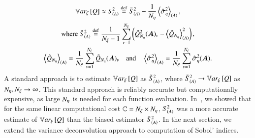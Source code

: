 \begin{gather} \label{eq:var-deconv}
    \mathbb{V}ar_{\xi}\left[Q\right] \approx S^2_{\left( A \right)} \overset{\operatorname{def}}{=} \tilde{S}^2_{\left( A \right)} - \frac{1}{{N_\eta}}\left< \hat{\sigma}^2_\eta \right>_{\left(A \right)} ,\\ \label{eq:samp-var}
    \text{where } \tilde{S}^2_{\left( A \right)} \overset{\operatorname{def}}{=} \frac{1}{{N_\xi} - 1} \sum_{v=1}^{{N_\xi}} \left( \tilde{Q}_{{N_\eta}}^2 (\bm{A})_v - \left< \tilde{Q}_{{N_\eta}} \right>_{\left(A \right)}^2 \right) , \\ \nonumber 
    \left< \tilde{Q}_{{N_\eta}} \right>_{\left(A \right)} = \frac{1}{{N_\xi}} \sum_{v=1}^{{N_\xi}} \tilde{Q}_{{N_\eta}}(\bm{A})_v \quad \text{and} \quad \left< \hat{\sigma}^2_\eta \right>_{\left(A \right)} = \frac{1}{{N_\xi}} \sum_{v=1}^{{N_\xi}} \hat{\sigma}^2_\eta(\bm{A}) .
\end{gather}
A standard approach is to estimate $\mathbb{V}ar_{\xi}\left[Q\right]$ as $\tilde{S}^2_{\left( A \right)}$, where $\tilde{S}^2_{\left( A \right)} \rightarrow \mathbb{V}ar_{\xi}\left[Q\right]$ as ${N_\eta},{N_\xi} \rightarrow \infty$. 
This standard approach is reliably accurate but computationally expensive, as large ${N_\eta}$ is needed for each function evaluation.
In~\cite{clements-etal-2024}, we showed that for the same linear computational cost $\mathbb{C} = {N_\xi} \times {N_\eta}$, $S^2_{\left( A \right)}$ was a more accurate estimate of $\mathbb{V}ar_{\xi}\left[Q\right]$ than the biased estimator $\tilde{S}^2_{\left( A \right)}$. 
In the next section, we extend the variance deconvolution approach to computation of Sobol' indices. 